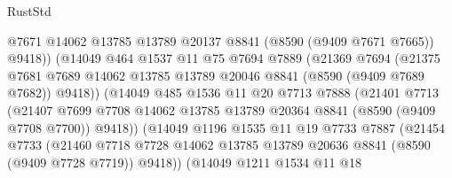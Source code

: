 \begin{lexlean}{RustStd}
\begin{coremodule}
                            @7671
                            @14062
                            @13785
                            @13789
                            @20137
                            @8841
                            (@8590 (@9409 @7671 @7665))
                            @9418))
                        (@14049
                          @464
                          @1537
                          @11
                          @75
                          @7694
                          @7889
                          (@21369
                            @7694
                            (@21375
                              @7681
                              @7689
                              @14062
                              @13785
                              @13789
                              @20046
                              @8841
                              (@8590 (@9409 @7689 @7682))
                              @9418))
                          (@14049
                            @485
                            @1536
                            @11
                            @20
                            @7713
                            @7888
                            (@21401
                              @7713
                              (@21407
                                @7699
                                @7708
                                @14062
                                @13785
                                @13789
                                @20364
                                @8841
                                (@8590 (@9409 @7708 @7700))
                                @9418))
                            (@14049
                              @1196
                              @1535
                              @11
                              @19
                              @7733
                              @7887
                              (@21454
                                @7733
                                (@21460
                                  @7718
                                  @7728
                                  @14062
                                  @13785
                                  @13789
                                  @20636
                                  @8841
                                  (@8590 (@9409 @7728 @7719))
                                  @9418))
                              (@14049
                                @1211
                                @1534
                                @11
                                @18

\end{coremodule}
\end{lexlean}
